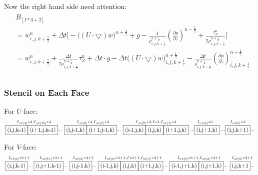 \documentclass{article}
\numberwithin{equation}{subsection}
\begin{document}
Now the right hand side need attention:
\begin{align}
\begin{split}
& B_{[I*3+2]}\\
& = w^n_{i,j,k+\frac{1}{2}} + \Delta t \Bigg[ -\Big( (U \cdot \bigtriangledown) w\Big)^{n+\frac{1}{2}} + g
 -\frac{1}{\rho^{n+\frac{1}{2}}_{i,j,k+\frac{1}{2}}} (\frac{\partial p}{\partial z})^{n-\frac{1}{2}} + \frac{\tau^{n}_Z}{2\rho^{n+\frac{1}{2}}_{i,j,k+\frac{1}{2}}} \Bigg]\\
& = w^n_{i,j,k+\frac{1}{2}} + \frac{\Delta t}{2\rho^{n+\frac{1}{2}}_{i,j,k+\frac{1}{2}}}\tau^{n}_Z + \Delta t \cdot g - \Delta t \Big( (U \cdot \bigtriangledown) w\Big)^{n+\frac{1}{2}}_{i,j,k+\frac{1}{2}} - \frac{\Delta t}{\rho^{n+\frac{1}{2}}_{i,j,k+\frac{1}{2}}} (\frac{\partial p}{\partial z})^{n-\frac{1}{2}}_{i,j,k+\frac{1}{2}}\\
\end{split}
\end{align}



\subsubsection{Stencil on Each Face}

For $U$-face:
\begin{equation}
\begin{smallmatrix}
I_{nb[4]}*3,I_{nb[15]}*3  & I_{nb[2]}*3,I_{nb[7]}*3 & I_{nb[0]}*3, I*3, I_{nb[1]}*3 & I_{nb[3]}*3 & I_{nb[5]}*3 \\
\framebox{(i,j,k-1)}\framebox{(i+1,j,k-1)}\cdots & \framebox{(i,j-1,k)}\framebox{(i+1,j-1,k)}\cdots & \framebox{(i-1,j,k)}\framebox{(i,j,k)}\framebox{(i+1,j,k)} & \cdots \framebox{(i,j+1,k)} & \cdots \framebox{(i,j,k+1)}\cdots \\
\end{smallmatrix}
\end{equation}

For $V$-face:
\begin{equation}
\begin{smallmatrix}
I_{nb[4]}*3+1 & I_{nb[11]}*3+1 & I_{nb[2]}*3+1 & I_{nb[0]}*3+1,I*3+1,I_{nb[1]}*3+1 & I_{nb[9]}*3+1,I_{nb[3]}*3+1 & I_{nb[5]}*3+1 \\
\framebox{(i,j,k-1)}\cdots&\framebox{(i,j+1,k-1)}\cdots &\framebox{(i,j-1,k)}\cdots &\framebox{(i-1,j,k)}\framebox{(i,j,k)}\framebox{(i+1,j,k)} \cdots& \framebox{(i-1,j+1,k)}\framebox{(i,j+1,k)}\cdots & \framebox{i,j,k+1}\cdots \\
\end{smallmatrix}
\end{equation}
\end{document}
